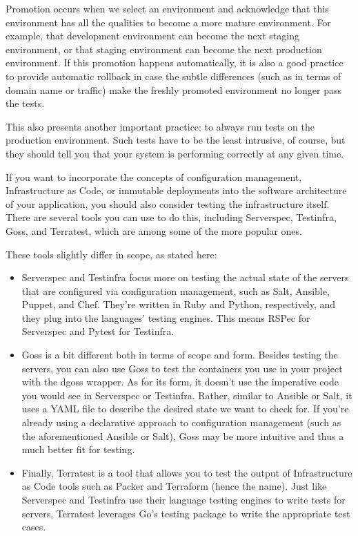 Promotion occurs when we select an environment and acknowledge that this environment has all the qualities to become a more mature environment. For example, that development environment can become the next staging environment, or that staging environment can become the next production environment. If this promotion happens automatically, it is also a good practice to provide automatic rollback in case the subtle differences (such as in terms of domain name or traffic) make the freshly promoted environment no longer pass the tests.

This also presents another important practice: to always run tests on the production environment. Such tests have to be the least intrusive, of course, but they should tell you that your system is performing correctly at any given time.


If you want to incorporate the concepts of configuration management, Infrastructure as Code, or immutable deployments into the software architecture of your application, you should also consider testing the infrastructure itself. There are several tools you can use to do this, including Serverspec, Testinfra, Goss, and Terratest, which are among some of the more popular ones.

These tools slightly differ in scope, as stated here:

\begin{itemize}
\item 
Serverspec and Testinfra focus more on testing the actual state of the servers that are configured via configuration management, such as Salt, Ansible, Puppet, and Chef. They're written in Ruby and Python, respectively, and they plug into the languages' testing engines. This means RSPec for Serverspec and Pytest for Testinfra.

\item 
Goss is a bit different both in terms of scope and form. Besides testing the servers, you can also use Goss to test the containers you use in your project with the dgoss wrapper. As for its form, it doesn't use the imperative code you would see in Serverspec or Testinfra. Rather, similar to Ansible or Salt, it uses a YAML file to describe the desired state we want to check for. If you're already using a declarative approach to configuration management (such as the aforementioned Ansible or Salt), Goss may be more intuitive and thus a much better fit for testing.

\item 
Finally, Terratest is a tool that allows you to test the output of Infrastructure as Code tools such as Packer and Terraform (hence the name). Just like Serverspec and Testinfra use their language testing engines to write tests for servers, Terratest leverages Go's testing package to write the appropriate test cases.
\end{itemize}

